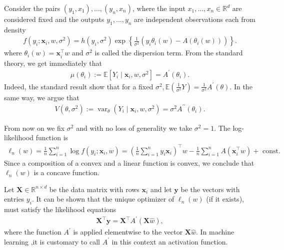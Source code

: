 Consider the pairs $\left(y_1, x_1\right), \ldots,\left(y_n, x_n\right)$, where the input $x_1, \ldots, x_n \in \mathbb{R}^d$ are considered fixed and the outputs $y_1, \ldots, y_n$ are independent observations each from density
\begin{align*}
f\left(y_i ; \mathbf{x}_i, w, \sigma^2\right)=h\left(y_i, \sigma^2\right) \exp \left\{\frac{1}{\sigma^2}\left(y_i \theta_i(w)-A\left(\theta_i(w)\right)\right)\right\} .
\end{align*}
where $\theta_i(w)=\mathbf{x}_i^{\top} w$ and $\sigma^2$ is called the dispersion term. From the standard theory, we get immediately that
\begin{align*}
\mu\left(\theta_i\right):=\mathbb{E}\left[Y_i \mid \mathbf{x}_i, w, \sigma^2\right]=A^{\prime}\left(\theta_i\right) .
\end{align*}
Indeed, the standard result show that for a fixed $\sigma^2, \mathbb{E}\left(\frac{1}{\sigma^2} Y\right)= \frac{1}{\sigma^2} A^{\prime}(\theta)$. In the same way, we argue that
\begin{align*}
V\left(\theta, \sigma^2\right):=\operatorname{var}_\theta\left(Y_i \mid \mathbf{x}_i, w, \sigma^2\right)=\sigma^2 A^{\prime \prime}\left(\theta_i\right) .
\end{align*}


From now on we fix $\sigma^2$ and with no loss of generality we take $\sigma^2=1$. The log-likelihood function is
\begin{align*}
\ell_n(w)=\frac{1}{n} \sum_{i=1}^n \log f\left(y_i ; \mathbf{x}_i, w\right)=\left(\frac{1}{n} \sum_{i=1}^n y_i \mathbf{x}_i\right)^{\top} w-\frac{1}{n} \sum_{i=1}^n A\left(\mathbf{x}_i^{\top} w\right)+\text { const. }
\end{align*}
Since a composition of a convex and a linear function is convex, we conclude that $\ell_n(w)$ is a concave function.

Let $\mathbf{X} \in \mathbb{R}^{n \times d}$ be the data matrix with rows $\mathbf{x}_i$ and let $\mathbf{y}$ be the vectors with entries $y_i$. It can be shown that the unique optimizer of $\ell_n(w)$ (if it exists), must satisfy the likelihood equations
\begin{align*}
\mathbf{X}^{\top} \mathbf{y}=\mathbf{X}^{\top} A^{\prime}(\mathbf{X} \widehat{w}),
\end{align*}
where the function $A^{\prime}$ is applied elementwise to the vector $\mathbf{X} \widehat{w}$. In machine learning ,it is customary to call $A^{\prime}$ in this context an activation function.

